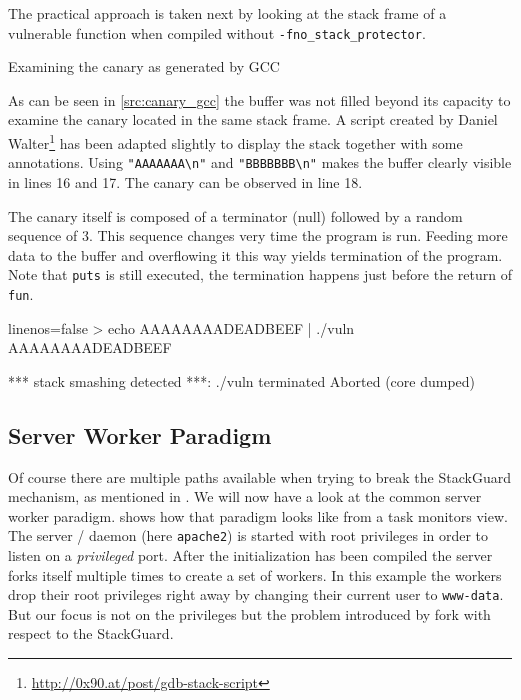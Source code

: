 \documentclass[article]{uibk}
\begin{document}
The practical approach is taken next by looking at the stack frame of a
vulnerable function when compiled without \texttt{-fno\_stack\_protector}.

\begin{listing}[h!]
    \begin{minipage}[t]{0.32\textwidth}
    \end{minipage}
    \begin{minipage}[t]{0.33\textwidth}
    \end{minipage}
    \begin{minipage}[t]{0.33\textwidth}
    \end{minipage}
    \caption{Examining the canary as generated by GCC}
    \label{src:canary_gcc}
\end{listing}

As can be seen in \cref{src:canary_gcc} the buffer was not filled beyond its
capacity to examine the canary located in the same stack frame. A script
created by Daniel Walter\footnote{\url{http://0x90.at/post/gdb-stack-script}}
has been adapted slightly to display the stack together with some annotations.
Using \texttt{"AAAAAAA\textbackslash{}n"} and
\texttt{"BBBBBBB\textbackslash{}n"} makes the buffer clearly visible in lines
16 and 17. The canary can be observed in line 18.

The canary itself is composed of a terminator (null) followed by a random
sequence of \SI{3}{\byte}. This sequence changes very time the program is run.
Feeding more data to the buffer and overflowing it this way yields termination
of the program. Note that \texttt{puts} is still executed, the termination
happens just before the return of \texttt{fun}.

\begin{code*}{linenos=false}
    > echo AAAAAAAADEADBEEF | ./vuln
    AAAAAAAADEADBEEF

    *** stack smashing detected ***: ./vuln terminated
    Aborted (core dumped)
\end{code*}

\subsection{Server Worker Paradigm}

Of course there are multiple paths available when trying to break the
StackGuard mechanism, as mentioned in \cite{phrack_stack_guard}. We will now
have a look at the common server worker paradigm. 
shows how that paradigm looks like from a task monitors view. The server /
daemon (here \texttt{apache2}) is started with root privileges in order to
listen on a \textit{privileged} port. After the initialization has been
compiled the server forks itself multiple times to create a set of workers. In
this example the workers drop their root privileges right away by changing
their current user to \texttt{www-data}. But our focus is not on the privileges
but the problem introduced by fork with respect to the StackGuard.
\end{document}
